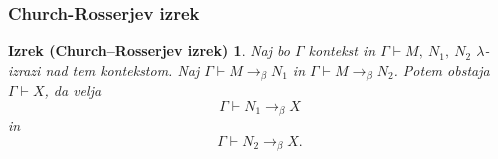 \documentclass{beamer}
\newtheorem{izrek_crosser}{Izrek (Church–Rosserjev izrek)}
\begin{document}
\begin{frame}[fragile]
\frametitle{Church-Rosserjev izrek}
\begin{izrek_crosser}
    Naj bo \(\Gamma\) kontekst in \(\Gamma \vdash M,\ N_1,\ N_2\) \(\lambda\)-izrazi nad tem kontekstom. Naj \(\Gamma \vdash M \rightarrow_\beta N_1\) in \(\Gamma \vdash M \rightarrow_\beta N_2\). Potem obstaja \(\Gamma \vdash X\), da velja
    \[
        \Gamma \vdash N_1 \rightarrow_\beta X
    \]
    in
    \[
        \Gamma \vdash N_2 \rightarrow_\beta X.
    \]
\end{izrek_crosser}

\end{frame}

\end{document}
